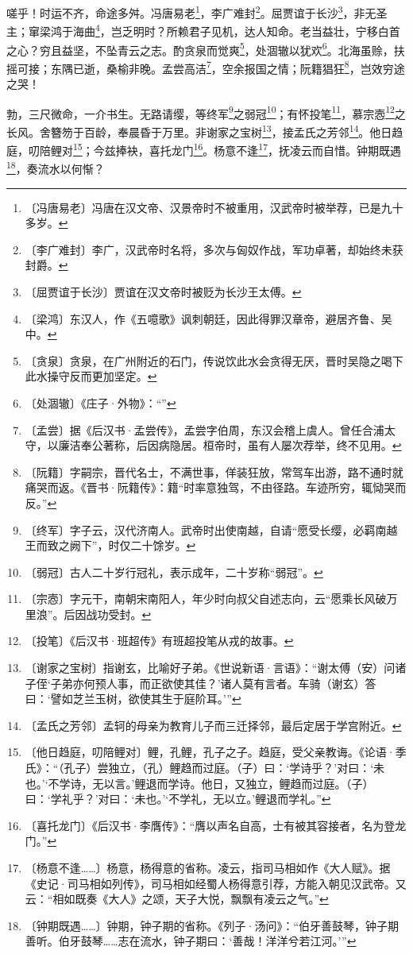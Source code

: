 \documentclass[12pt,UTF-8,openany,a4]{ctexbook}
\begin{document}
\begin{large}
    嗟乎！时运不齐，命途多舛。冯唐易老\footnote{〔冯唐易老〕\yiwen 冯唐在汉文帝、汉景帝时不被重用，汉武帝时被举荐，已是九十多岁。}，李广难封\footnote{〔李广难封〕\yiwen 李广，汉武帝时名将，多次与匈奴作战，军功卓著，却始终未获封爵。}。屈贾谊于长沙\footnote{〔屈贾谊于长沙〕\yiwen 贾谊在汉文帝时被贬为长沙王太傅。}，非无圣主；窜梁鸿于海曲\footnote{〔梁鸿〕\yiwen 东汉人，作《五噫歌》讽刺朝廷，因此得罪汉章帝，避居齐鲁、吴中。}，岂乏明时？所赖君子见机，达人知命。老当益壮，宁移白首之心？穷且益坚，不坠青云之志。酌贪泉而觉爽\footnote{〔贪泉〕\yiwen 贪泉，在广州附近的石门，传说饮此水会贪得无厌，晋时吴隐之喝下此水操守反而更加坚定。}，处涸辙以犹欢\footnote{〔处涸辙〕\yiwen 《庄子·外物》：“”}。北海虽赊，扶摇可接；东隅已逝，桑榆非晚。孟尝高洁\footnote{〔孟尝〕\yiwen 据《后汉书·孟尝传》，孟尝字伯周，东汉会稽上虞人。曾任合浦太守，以廉洁奉公著称，后因病隐居。桓帝时，虽有人屡次荐举，终不见用。}，空余报国之情；阮籍猖狂\footnote{〔阮籍〕\yiwen 字嗣宗，晋代名士，不满世事，佯装狂放，常驾车出游，路不通时就痛哭而返。《晋书·阮籍传》：籍“时率意独驾，不由径路。车迹所穷，辄恸哭而反。”}，岂效穷途之哭！
    
    勃，三尺微命，一介书生。无路请缨，等终军\footnote{〔终军〕\yiwen 字子云，汉代济南人。武帝时出使南越，自请“愿受长缨，必羁南越王而致之阙下”，时仅二十馀岁。}之弱冠\footnote{〔弱冠〕\yiwen 古人二十岁行冠礼，表示成年，二十岁称“弱冠”。}；有怀投笔\footnote{〔宗悫〕\yiwen 字元干，南朝宋南阳人，年少时向叔父自述志向，云“愿乘长风破万里浪”。后因战功受封。}，慕宗悫\footnote{〔投笔〕\yiwen 《后汉书·班超传》有班超投笔从戎的故事。}之长风。舍簪笏于百龄，奉晨昏于万里。非谢家之宝树\footnote{〔谢家之宝树〕\yiwen 指谢玄，比喻好子弟。《世说新语·言语》：“谢太傅（安）问诸子侄‘子弟亦何预人事，而正欲使其佳？’诸人莫有言者。车骑（谢玄）答曰：‘譬如芝兰玉树，欲使其生于庭阶耳。’”}，接孟氏之芳邻\footnote{〔孟氏之芳邻〕\yiwen 孟轲的母亲为教育儿子而三迁择邻，最后定居于学宫附近。}。他日趋庭，叨陪鲤对\footnote{〔他日趋庭，叨陪鲤对〕\yiwen 鲤，孔鲤，孔子之子。趋庭，受父亲教诲。《论语·季氏》：“（孔子）尝独立，（孔）鲤趋而过庭。（子）曰：‘学诗乎？’对曰：‘未也。’‘不学诗，无以言。’鲤退而学诗。他日，又独立，鲤趋而过庭。（子）曰：‘学礼乎？’对曰：‘未也。’‘不学礼，无以立。’鲤退而学礼。”}；今兹捧袂，喜托龙门\footnote{〔喜托龙门〕\yiwen 《后汉书·李膺传》：“膺以声名自高，士有被其容接者，名为登龙门。”}。杨意不逢\footnote{〔杨意不逢……〕\yiwen 杨意，杨得意的省称。凌云，指司马相如作《大人赋》。据《史记·司马相如列传》，司马相如经蜀人杨得意引荐，方能入朝见汉武帝。又云：“相如既奏《大人》之颂，天子大悦，飘飘有凌云之气。”}，抚凌云而自惜。钟期既遇\footnote{〔钟期既遇……〕\yiwen 钟期，钟子期的省称。《列子·汤问》：“伯牙善鼓琴，钟子期善听。伯牙鼓琴……志在流水，钟子期曰：‘善哉！洋洋兮若江河。’”}，奏流水以何惭？
    

\end{large}
\end{document}
